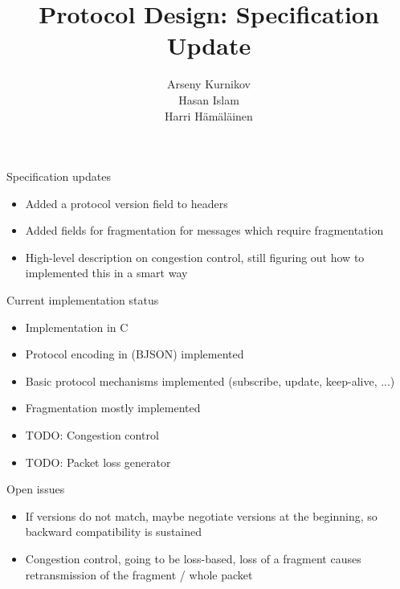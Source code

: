 \documentclass{beamer}
\title{Protocol Design: Specification Update}
\author{Arseny Kurnikov\\
Hasan Islam\\
Harri Hämäläinen}
\begin{document}
\begin{frame}
\titlepage
\end{frame}


\begin{frame}{Specification updates}
    \begin{itemize}
        \item Added a protocol version field to headers
        \item Added fields for fragmentation for messages which require
        fragmentation
        \item High-level description on congestion control, still figuring out
        how to implemented this in a smart way
    \end{itemize}
\end{frame}

\begin{frame}{Current implementation status}
    \begin{itemize}
        \item Implementation in C
        \item Protocol encoding in (BJSON) implemented
        \item Basic protocol mechanisms implemented (subscribe, update,
        keep-alive, ...)
        \item Fragmentation mostly implemented
        \item TODO: Congestion control 
        \item TODO: Packet loss generator
    \end{itemize}
\end{frame}

\begin{frame}{Open issues}
    \begin{itemize}
        \item If versions do not match, maybe negotiate versions at the beginning,
              so backward compatibility is sustained
        \item Congestion control, going to be loss-based, loss of a fragment
        causes retransmission of the fragment / whole packet
    \end{itemize}
\end{frame}
\end{document}
